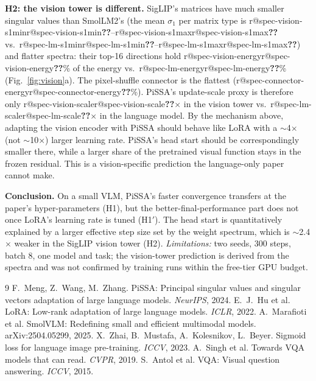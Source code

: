 \documentclass[10pt,a4paper]{article}
\makeatletter
\newcommand{\R}[1]{\ifcsname r@#1\endcsname\csname r@#1\endcsname\else\textbf{??}\fi}
\makeatother
\begin{document}
\textbf{H2: the vision tower is different.} SigLIP's matrices have much smaller singular values than SmolLM2's (the mean $\sigma_1$ per matrix type is \R{spec-vision-s1min}--\R{spec-vision-s1max} vs.\ \R{spec-lm-s1min}--\R{spec-lm-s1max}) and flatter spectra: their top-16 directions hold \R{spec-vision-energy}\% of the energy vs.\ \R{spec-lm-energy}\% (Fig.~\ref{fig:vision}a). The pixel-shuffle connector is the flattest (\R{spec-connector-energy}\%). PiSSA's update-scale proxy is therefore only \R{spec-vision-scale}$\times$ in the vision tower vs.\ \R{spec-lm-scale}$\times$ in the language model. By the mechanism above, adapting the vision encoder with PiSSA should behave like LoRA with a $\sim$4$\times$ (not $\sim$10$\times$) larger learning rate. PiSSA's head start should be correspondingly smaller there, while a larger share of the pretrained visual function stays in the frozen residual. This is a vision-specific prediction the language-only paper cannot make.

\textbf{Conclusion.} On a small VLM, PiSSA's faster convergence transfers at the paper's hyper-parameters (H1), but the better-final-performance part does not once LoRA's learning rate is tuned (H1$'$). The head start is quantitatively explained by a larger effective step size set by the weight spectrum, which is $\sim$2.4$\times$ weaker in the SigLIP vision tower (H2). \emph{Limitations:} two seeds, 300 steps, batch 8, one model and task; the vision-tower prediction is derived from the spectra and was not confirmed by training runs within the free-tier GPU budget.

\vspace{-4pt}
{\footnotesize
\begin{thebibliography}{9}\setlength{\itemsep}{0pt}
 F.~Meng, Z.~Wang, M.~Zhang. PiSSA: Principal singular values and singular vectors adaptation of large language models. \emph{NeurIPS}, 2024.
 E.~J.~Hu et al. LoRA: Low-rank adaptation of large language models. \emph{ICLR}, 2022.
 A.~Marafioti et al. SmolVLM: Redefining small and efficient multimodal models. arXiv:2504.05299, 2025.
 X.~Zhai, B.~Mustafa, A.~Kolesnikov, L.~Beyer. Sigmoid loss for language image pre-training. \emph{ICCV}, 2023.
 A.~Singh et al. Towards VQA models that can read. \emph{CVPR}, 2019.
 S.~Antol et al. VQA: Visual question answering. \emph{ICCV}, 2015.
\end{thebibliography}}
\end{document}
